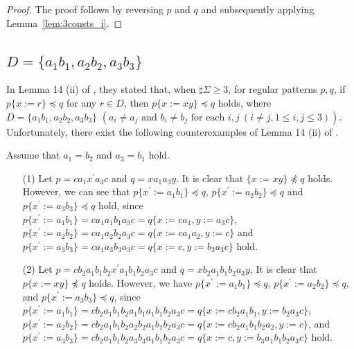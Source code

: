 \begin{proof}
%
%
The proof follows by reversing $p$ and $q$ and subsequently applying Lemma~\ref{lem:3consts_i}.
\end{proof}

\subsection{$D = \{ a_{1}b_{1}, a_{2}b_{2}, a_{3}b_{3}\}$}\label{subsec:d3c}

In Lemma 14 (ii) of \cite{Sato1}, 
they stated that, when $\sharp \Sigma \geq 3$, for regular patterns $p,q$, if $p\{x:=r\}\preceq q$ for any $r\in D$, then $p\{x:=xy\} \preceq q$ holds, where 
$D = \{ a_{1}b_{1}, a_{2}b_{2}, a_{3}b_{3}\}$ $(a_{i} \ne a_{j} \mbox{ and } b_{i} \ne b_{j} \mbox{ for each } i,j~(i\ne j, 1\le i,j\le 3))$.
Unfortunately, there exist the following counterexamples of Lemma 14 (ii) of \cite{Sato1}.
\begin{ex}\label{CounterExample_Lemma14}
Assume that $a_1=b_2$ and $a_3=b_1$ hold.
  
\begin{itemize}
\item[(1)] 
Let $p=ca_1x^{\prime}a_3c$ and $q=xa_1a_3y$.
It is clear that $\{x:=xy\} \not\preceq q$ holds.
However, we can see that $p\{x^{\prime}:=a_1b_1\}\preceq q$, $p\{x^{\prime}:=a_2b_2\}\preceq q$ and $p\{x^{\prime}:=a_3b_3\}\preceq q$ hold, 
since
$p\{x^{\prime}:=a_1b_1\}=ca_1a_1b_1a_3c=q\{x:=ca_1,y:=a_3c\}$,
$p\{x^{\prime}:=a_2b_2\}=ca_1a_2b_2a_3c=q\{x:=ca_1a_2,y:=c\}$ and 
$p\{x^{\prime}:=a_3b_3\}=ca_1a_3b_3a_3c=q\{x:=c,y:=b_3a_3c\}$ hold.

\item[(2)] 
Let $p=cb_2a_1b_1b_2x^{\prime}a_1b_1b_2a_3c$ and $q=xb_2a_1b_1b_2a_3y$.
It is clear that $p\{x:=xy\} \not\preceq q$ holds.
However, we have $p\{x^{\prime}:=a_1b_1\}\preceq q$, $p\{x^{\prime}:=a_2b_2\} \preceq q$, and $p\{x^{\prime}:=a_3b_3\} \preceq q$, 
since  
$p\{x^{\prime}:=a_1b_1\}=cb_2a_1b_1b_2a_1b_1a_1b_1b_2a_3c=q\{x:=cb_2a_1b_1,y:=b_2a_3c\}$,
$p\{x^{\prime}:=a_2b_2\}=cb_2a_1b_1b_2a_2b_2a_1b_1b_2a_3c=q\{x:=cb_2a_1b_1b_2a_2,y:=c\}$,
and  $p\{x^{\prime}:=a_3b_3\}=cb_2a_1b_1b_2a_3b_3a_1b_1b_2a_3c=q\{x:=c,y:=b_3a_1b_1b_2a_3c\}$ hold.
\end{itemize}
\end{ex}

